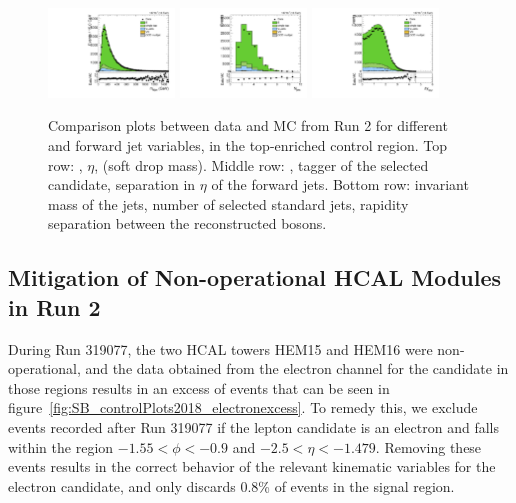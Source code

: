 \begin{figure}[htbp]
  \includegraphics[width=0.3\textwidth]{fig/controlPlots/CR_b1_allL_allP_allC_allD_Run2_lnujj_vbfMass.pdf}
  \includegraphics[width=0.3\textwidth]{fig/controlPlots/CR_b1_allL_allP_allC_allD_Run2_lnujj_nJets.pdf}
  \includegraphics[width=0.3\textwidth]{fig/controlPlots/CR_b1_allL_allP_allC_allD_Run2_dy.pdf}\\
  \caption{
    Comparison plots between data and MC from Run 2 for different \Vhad and \VBF forward jet variables, in the top-enriched control region.
    Top row: \pt, $\eta$, \MJ (soft drop mass).
    Middle row: \nsubjDDT, \DoubleB tagger of the selected \Vhad candidate, separation in $\eta$ of the \VBF forward jets.
    Bottom row: invariant mass of the \VBF jets, number of selected standard jets, rapidity separation between the reconstructed bosons.
  }
  \label{fig:CR_controlPlotsRun2_2}
\end{figure}

\clearpage
\subsection{Mitigation of Non-operational HCAL Modules in Run 2}

During Run 319077, the two HCAL towers HEM15 and HEM16 were non-operational, and the data obtained from the electron channel for the \Wtolnu candidate in those regions results in an excess of events that can be seen in figure~\ref{fig:SB_controlPlots2018_electronexcess}. %
To remedy this, we exclude events recorded after Run 319077 if the lepton candidate is an electron and falls within the region $-1.55<\phi<-0.9$ and $-2.5<\eta<-1.479$.
Removing these events results in the correct behavior of the relevant kinematic variables for the electron candidate, and only discards 0.8\% of events in the signal region.


